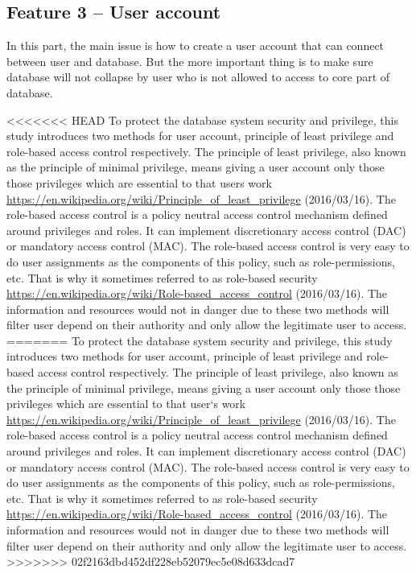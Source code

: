 \documentclass[a4paper]{article} %
\begin{document}
	\subsection*{Feature 3 -- User account}
	\label{task1:feature3}
	
	In this part, the main issue is how to create a user account that can connect between user and database. But the more important thing is to make sure database will not collapse by user who is not allowed to access to core part of database.
	
	<<<<<<< HEAD
	To protect the database system security and privilege, this study introduces two methods for user account, principle of least privilege and role-based access control respectively. The principle of least privilege, also known as the principle of minimal privilege, means giving a user account only those those privileges which are essential to that users work \url{https://en.wikipedia.org/wiki/Principle_of_least_privilege} (2016/03/16). The role-based access control is a policy neutral access control mechanism defined around privileges and roles. It can implement discretionary access control (DAC) or mandatory access control (MAC). The role-based access control is very easy to do user assignments as the components of this policy, such as role-permissions, etc. That is why it sometimes referred to as role-based security \url{https://en.wikipedia.org/wiki/Role-based_access_control} (2016/03/16). The information and resources would not in danger due to these two methods will filter user depend on their authority and only allow the legitimate user to access.
	=======
	To protect the database system security and privilege, this study introduces two methods for user account, principle of least privilege and role-based access control respectively. The principle of least privilege, also known as the principle of minimal privilege, means giving a user account only those those privileges which are essential to that user`s work \url{https://en.wikipedia.org/wiki/Principle_of_least_privilege} (2016/03/16). The role-based access control is a policy neutral access control mechanism defined around privileges and roles. It can implement discretionary access control (DAC) or mandatory access control (MAC). The role-based access control is very easy to do user assignments as the components of this policy, such as role-permissions, etc. That is why it sometimes referred to as role-based security \url{https://en.wikipedia.org/wiki/Role-based_access_control} (2016/03/16). The information and resources would not in danger due to these two methods will filter user depend on their authority and only allow the legitimate user to access.
	>>>>>>> 02f2163dbd452df228eb52079ec5e08d633dcad7
	
\end{document}
